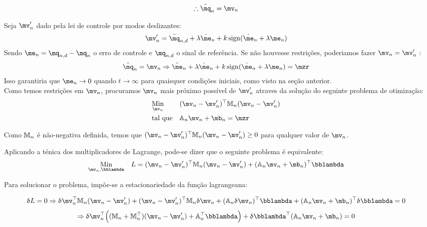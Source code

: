 \begin{equation} \label{eq:ClosedLoopV}
\therefore \ddot{\mq}_n = \mv_n
\end{equation}

Seja $\mv'_n$ dado pela lei de controle por modos deslizantes:
\begin{equation} \label{eq:SMControlowLasV1'}
\mv'_n = \ddot{\mq}_{n, d} + \lambda \dot{\me}_n + k \sign (\dot{\me}_n + \lambda \me_n)
\end{equation}
Sendo $ \me_n = \mq_{n,d} - \mq_n $ o erro de controle e $\mq_{n,d}$ o sinal de refer\^encia. Se n\~ao houvesse restri\c{c}\~oes, poderiamos fazer $ \mv_n = \mv'_n $ :
$$ \ddot{\mq}_n = \mv_n \Rightarrow  \ddot{\me}_n + \lambda \dot{\me}_n + k \sign (\dot{\me}_n + \lambda \me_n) = \mzr$$
Isso garantiria que $\me_n \rightarrow 0$ quando $t \rightarrow \infty$ para quaisquer condi\c{c}\~oes iniciais, como visto na se\c{c}\~ao anterior. \\

Como temos restri\c{c}\~oes em $\mv_n$, procuramos $\mv_n$ mais pr\'oximo poss\'ivel de $\mv'_n$ atraves da solu\c{c}\~ao do seguinte problema de otimiza\c{c}\~ao:
\begin{equation} \label{eq:Optimization}
\begin{aligned}
& \underset{\mv_n}{\text{Min}}
& & (\mv_n - \mv'_n)^\top \mM_n (\mv_n - \mv'_n) \\
& \text{tal que}
& & \mA_n \mv_n + \mb_n = \mzr
\end{aligned}
\end{equation}

Como $\mathbb{M}_n$ \'e n\~ao-negativa definida, temos que $(\mv_n - \mv'_n)^\top \mM_n (\mv_n - \mv'_n) \geq 0 $ para qualquer valor de $\mv_n$.

Aplicando a t\'enica dos multiplicadores de Lagrange, pode-se dizer que o seguinte problema é equivalente:
\begin{equation}
\begin{aligned}
& \underset{\mv_n, \mlambda}{\text{Min}}
& & L = (\mv_n - \mv'_n)^\top \mM_n (\mv_n - \mv'_n) + (\mA_n \mv_n + \mb_n)^\top \mlambda \\
\end{aligned}
\end{equation}


Para solucionar o problema, imp\~oe-se a estacionariedade da fun\c{c}\~ao lagrangeana:

$$ \dl L = 0 \Rightarrow \dl \mv_n^\top \mM_n (\mv_n - \mv'_n) + (\mv_n - \mv'_n)^\top \mM_n \dl \mv_n + (\mA_n \dl \mv_n)^\top \mlambda + (\mA_n \mv_n + \mb_n)^\top \dl \mlambda = 0 $$
$$ \Rightarrow \dl \mv_n^\top \Big( (\mM_n + \mM_n^\top)(\mv_n - \mv'_n) + \mA_n^\top \mlambda \Big) + \dl \mlambda^\top (\mA_n \mv_n + \mb_n) = 0 $$

